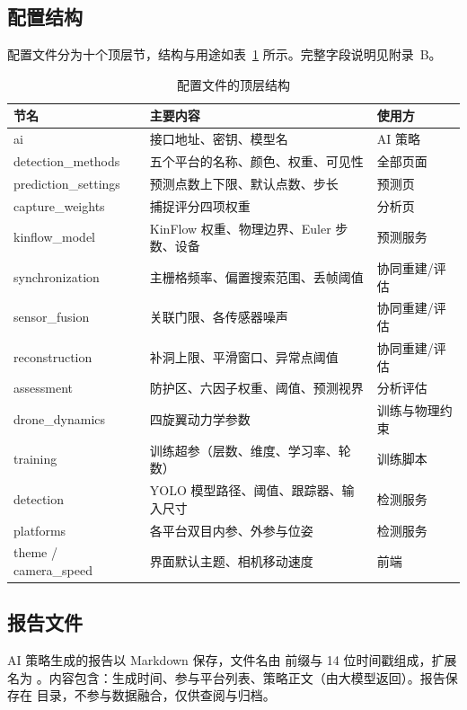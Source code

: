 \subsection{配置结构}

配置文件分为十个顶层节，结构与用途如表~\ref{tab:conftree} 所示。完整字段说明见附录~B。

\begin{table}[H]
\centering
\caption{配置文件的顶层结构}
\label{tab:conftree}
\small
\begin{tabularx}{\linewidth}{@{}>{\raggedright\ttfamily\scriptsize}p{4.2cm}>{\raggedright\scriptsize}p{4.6cm}>{\raggedright\arraybackslash}X@{}}
\toprule
节名 & 主要内容 & 使用方 \\
\midrule
ai & 接口地址、密钥、模型名 & AI 策略 \\
detection\_methods & 五个平台的名称、颜色、权重、可见性 & 全部页面 \\
prediction\_settings & 预测点数上下限、默认点数、步长 & 预测页 \\
capture\_weights & 捕捉评分四项权重 & 分析页 \\
kinflow\_model & KinFlow 权重、物理边界、Euler 步数、设备 & 预测服务 \\
synchronization & 主栅格频率、偏置搜索范围、丢帧阈值 & 协同重建/评估 \\
sensor\_fusion & 关联门限、各传感器噪声 & 协同重建/评估 \\
reconstruction & 补洞上限、平滑窗口、异常点阈值 & 协同重建/评估 \\
assessment & 防护区、六因子权重、阈值、预测视界 & 分析评估 \\
drone\_dynamics & 四旋翼动力学参数 & 训练与物理约束 \\
training & 训练超参（层数、维度、学习率、轮数） & 训练脚本 \\
detection & YOLO 模型路径、阈值、跟踪器、输入尺寸 & 检测服务 \\
platforms & 各平台双目内参、外参与位姿 & 检测服务 \\
theme / camera\_speed & 界面默认主题、相机移动速度 & 前端 \\
\bottomrule
\end{tabularx}
\end{table}

\subsection{报告文件}

AI 策略生成的报告以 Markdown 保存，文件名由  前缀与 14 位时间戳组成，扩展名为 。内容包含：生成时间、参与平台列表、策略正文（由大模型返回）。报告保存在  目录，不参与数据融合，仅供查阅与归档。
